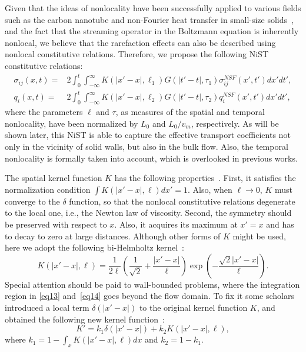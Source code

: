 \documentclass[lineno]{jfm}
\begin{document}
Given that the ideas of nonlocality have been successfully applied to various fields such as the carbon nanotube and non-Fourier heat transfer in small-size solids~\citep{cite4,cite5,cite6,Eringen1976,cite1}, and the fact that the streaming operator in the Boltzmann equation is inherently nonlocal, we believe that the rarefaction effects can also be described using nonlocal constitutive relations. Therefore, we propose the following NiST constitutive relations:
\begin{eqnarray}
	\sigma_{ij}(x,t) = &2\int_{0}^t \int_{-\infty}^{\infty} K(|x'-x|,\ell_1) G(|t'-t|,\tau_{1})\sigma_{ij}^{NSF}(x',t') dx'dt', \label{eq13} \\
	q_{i}(x,t) = &2\int_{0}^t \int_{-\infty}^{\infty}  K(|x'-x|,\ell_2) G(|t'-t|,\tau_{2})q_{i}^{NSF}(x',t') dx'dt', \label{eq14}
\end{eqnarray}
where the parameters $\ell$ and $\tau$, as measures of the spatial and temporal nonlocality,  have been normalized by $L_0$ and $L_0/v_m$, respectively. As will be shown later, this NiST is able to capture the effective transport coefficients not only in the vicinity of solid walls, but also in the bulk flow. Also, the temporal nonlocality is formally taken into account, which is overlooked in previous works.
	
The spatial kernel function $K$ has the following properties~\citep{cite1}. First, 
it satisfies the normalization condition 
$\int K(|x'-x|,\ell) dx'= 1$.
Also, when $\ell \rightarrow 0$, $K$ must converge to the $\delta$ function, so that the nonlocal constitutive relations degenerate to the local one, i.e., the Newton law of viscosity. 
Second, the symmetry should be preserved with respect to $x$. Also, it acquires its maximum at $x'=x$ and has to decay to zero at large distances. Although other forms of $K$ might be used,
here we adopt the following bi-Helmholtz kernel~\citep{cite15}:
\begin{equation}\label{eq19}
	K(|x'-x|,\ell)= \frac{1}{2 \ell} \left(\frac{1}{\sqrt{2}}+\frac{|x'-x|}{\ell}\right)\exp\left(-\frac{\sqrt{2}|x'-x|}{\ell}\right).
\end{equation}
Special attention should be paid to wall-bounded problems, where the integration region in \eqref{eq13} and~\eqref{eq14} goes beyond the flow domain. To fix it some scholars introduced a local term $\delta(|x'-x|)$ to the original kernel function $K$, and obtained the following new kernel function~\citep{cite15}:
\begin{equation}\label{eq20}
	K' = k_1 \delta(|x'-x|) + k_2 K(|x'-x|,\ell),
\end{equation}
where $k_1 = 1-\int_x K(|x'-x|,\ell)d{x}$ and $k_2 = 1-k_1$. %
\end{document}
